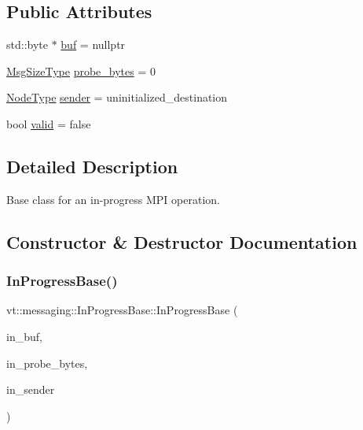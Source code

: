 \subsection*{Public Attributes}
\begin{DoxyCompactItemize}
\item 
std\+::byte $\ast$ \hyperlink{structvt_1_1messaging_1_1_in_progress_base_a57373105895853e9f6fccc06d9a88696}{buf} = nullptr
\item 
\hyperlink{namespacevt_a408e86a8c7c89309b52907dc5a513924}{Msg\+Size\+Type} \hyperlink{structvt_1_1messaging_1_1_in_progress_base_a702edc025a2cd95e5a267d5acbda9f1d}{probe\+\_\+bytes} = 0
\item 
\hyperlink{namespacevt_a866da9d0efc19c0a1ce79e9e492f47e2}{Node\+Type} \hyperlink{structvt_1_1messaging_1_1_in_progress_base_ad0c153e52ba71c9295a45d73a5d3ccd8}{sender} = uninitialized\+\_\+destination
\item 
bool \hyperlink{structvt_1_1messaging_1_1_in_progress_base_a5dce1ae0bdfaa40935023561e0d16671}{valid} = false
\end{DoxyCompactItemize}


\subsection{Detailed Description}
Base class for an in-\/progress M\+PI operation. 

\subsection{Constructor \& Destructor Documentation}
\mbox{\label{structvt_1_1messaging_1_1_in_progress_base_a0ba75fd3516ed6b29d0d52ca2bdf8477}} 
\subsubsection{\texorpdfstring{In\+Progress\+Base()}{InProgressBase()}}
{\footnotesize\ttfamily vt\+::messaging\+::\+In\+Progress\+Base\+::\+In\+Progress\+Base (\begin{DoxyParamCaption}\item[{std\+::byte $\ast$}]{in\+\_\+buf,  }\item[{\hyperlink{namespacevt_a408e86a8c7c89309b52907dc5a513924}{Msg\+Size\+Type}}]{in\+\_\+probe\+\_\+bytes,  }\item[{\hyperlink{namespacevt_a866da9d0efc19c0a1ce79e9e492f47e2}{Node\+Type}}]{in\+\_\+sender }\end{DoxyParamCaption})\hspace{0.3cm}{\ttfamily [inline]}}



